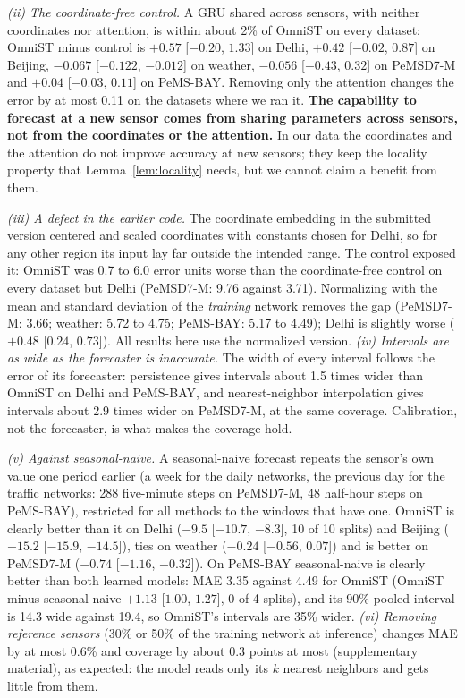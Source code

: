 \emph{(ii) The coordinate-free control.} A GRU shared across sensors, with neither coordinates nor
attention, is within about 2\% of OmniST on every dataset: OmniST minus control is $+0.57$ [$-0.20$, $1.33$]
on Delhi, $+0.42$ [$-0.02$, $0.87$] on Beijing, $-0.067$ [$-0.122$, $-0.012$] on weather, $-0.056$
[$-0.43$, $0.32$] on PeMSD7-M and $+0.04$ [$-0.03$, $0.11$] on PeMS-BAY. Removing only the attention
changes the error by at most 0.11 on the datasets where we ran it. \textbf{The capability to forecast
at a new sensor comes from sharing parameters across sensors, not from the coordinates or the
attention.} In our data the coordinates and the attention do not improve accuracy at new sensors; they
keep the locality property that Lemma~\ref{lem:locality} needs, but we cannot claim a benefit from them.

\emph{(iii) A defect in the earlier code.} The coordinate embedding in the submitted version centered and scaled
coordinates with constants chosen for Delhi, so for any other region its input lay far outside the intended range.
The control exposed it: OmniST was 0.7 to 6.0 error units worse than the coordinate-free control on every dataset
but Delhi (PeMSD7-M: 9.76 against 3.71). Normalizing with the mean and standard deviation of the \emph{training}
network removes the gap (PeMSD7-M: 3.66; weather: 5.72 to 4.75; PeMS-BAY: 5.17 to 4.49); Delhi is slightly worse
($+0.48$ [$0.24$, $0.73$]). All results here use the normalized version.
\emph{(iv) Intervals are as wide as the forecaster is inaccurate.} The width of every interval follows
the error of its forecaster: persistence gives intervals about 1.5 times wider than OmniST on Delhi
and PeMS-BAY, and nearest-neighbor interpolation gives intervals about 2.9 times wider on PeMSD7-M, at
the same coverage.
Calibration, not the forecaster, is what makes the coverage hold.

\emph{(v) Against seasonal-naive.} A seasonal-naive forecast repeats the sensor's own value one period earlier
(a week for the daily networks, the previous day for the traffic networks: 288 five-minute steps on PeMSD7-M, 48
half-hour steps on PeMS-BAY), restricted for all methods to the windows that have one. OmniST is clearly better than it on
Delhi ($-9.5$ [$-10.7$, $-8.3$], 10 of 10 splits) and Beijing ($-15.2$ [$-15.9$, $-14.5$]), ties on weather
($-0.24$ [$-0.56$, $0.07$]) and is better on PeMSD7-M ($-0.74$ [$-1.16$, $-0.32$]).
On PeMS-BAY seasonal-naive is clearly better than both learned models: MAE 3.35 against 4.49 for OmniST (OmniST
minus seasonal-naive $+1.13$ [$1.00$, $1.27$], 0 of 4 splits), and its 90\% pooled interval is 14.3 wide against
19.4, so OmniST's intervals are 35\% wider.
\emph{(vi) Removing reference sensors} (30\% or 50\% of the training network at inference) changes MAE by at most
0.6\% and coverage by about 0.3 points at most (supplementary material), as expected: the model reads only its $k$
nearest neighbors and gets little from them.
